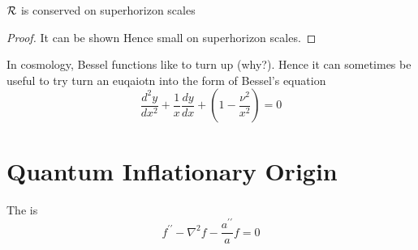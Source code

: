 \documentclass{article}
\begin{document}
\begin{prop}
$\mathcal{R}$ is conserved on superhorizon scales
\end{prop}
\begin{proof}
It can be shown 
Hence 
small on superhorizon scales. 
\end{proof}


\begin{remark}
In cosmology, Bessel functions like to turn up (why?). Hence it can sometimes be useful to try turn an euqaiotn into the form of Bessel's equation 
\[
\frac{d^2y}{dx^2} + \frac{1}{x} \frac{dy}{dx} + \left( 1-\frac{\nu^2}{x^2} \right ) = 0 
\]
\end{remark}


\section{Quantum Inflationary Origin}

\begin{definition}
The  is 
\[
f ^ { \prime \prime } - \nabla ^ { 2 } f - \frac { a ^ { \prime \prime } } { a } f = 0
\]
\end{definition}
\end{document}
